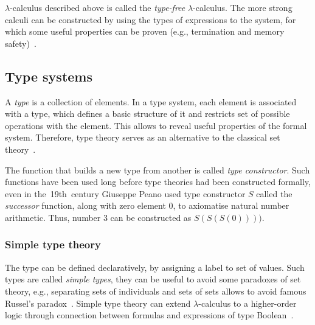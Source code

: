 \documentclass[article]{aaltoseries}
\begin{document}
$\lambda$-calculus described above is called the \textit{type-free} $\lambda$-calculus. The more strong calculi can be constructed by using the types of expressions to the system, for which some useful properties can be proven (e.g., termination and memory safety)~\cite{Bar13}.

\subsection{Type systems}
\label{sec:type_systems}

A \textit{type} is a collection of elements. In a type system, each element is associated with a type, which defines a basic structure of it and restricts set of possible operations with the element. This allows to reveal useful properties of the formal system. Therefore, type theory serves as an alternative to the classical set theory~\cite{Tho91}.

The function that builds a new type from another is called \textit{type constructor}. Such functions have been used long before type theories had been constructed formally, even in the~19th~century Giuseppe Peano used type constructor $S$ called the \textit{successor} function, along with zero element 0, to axiomatise natural number arithmetic. Thus, number $3$ can be constructed as $S(S(S(0))))$.


\subsubsection{Simple type theory}
The type can be defined declaratively, by assigning a label to set of values. Such types are called \textit{simple types}, they can be useful to avoid some paradoxes of set theory, e.g., separating sets of individuals and sets of sets allows to avoid famous Russel's paradox~\cite{Irv95}. Simple type theory can extend $\lambda$-calculus to a higher-order logic through connection between formulas and expressions of type Boolean~\cite{Paulson90}.

\end{document}
